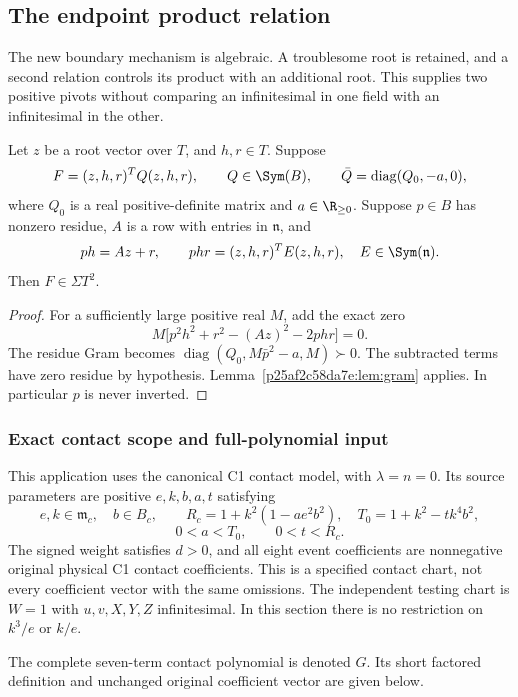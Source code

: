 \subsection{The endpoint product relation}

\label{component:p05180564ed05}
\label{p05180564ed05:sec:productrepair}
The new boundary mechanism is algebraic. A troublesome root is retained, and a second relation controls its product with an additional root. This supplies two positive pivots without comparing an infinitesimal in one field with an infinitesimal in the other.

\begin{lemma}\label{p05180564ed05:lem:productrepair}
Let $z$ be a root vector over $T$, and $h,r\in T$. Suppose
\[
F=(z,h,r)^TQ(z,h,r),\qquad Q\in\Sym(B),\qquad
\bar Q=\operatorname{diag}(Q_0,-a,0),
\]
where $Q_0$ is a real positive-definite matrix and $a\in\R_{\ge0}$. Suppose $p\in B$ has nonzero residue, $A$ is a row with entries in $\mathfrak n$, and
\[
ph=Az+r,\qquad phr=(z,h,r)^TE(z,h,r),\quad E\in\Sym(\mathfrak n).
\]
Then $F\in\Sigma T^2$.
\end{lemma}
\begin{proof}
For a sufficiently large positive real $M$, add the exact zero
\[
M\big[p^2h^2+r^2-(Az)^2-2phr\big]=0.
\]
The residue Gram becomes $\operatorname{diag}(Q_0,M\bar p^2-a,M)\succ0$. The subtracted terms have zero residue by hypothesis. Lemma~\ref{p25af2c58da7e:lem:gram} applies. In particular $p$ is never inverted.
\end{proof}

\subsubsection*{Exact contact scope and full-polynomial input}
This application uses the canonical C1 contact model, with $\lambda=n=0$. Its source parameters are positive $e,k,b,a,t$ satisfying
\[
e,k\in\mathfrak m_c,\quad b\in B_c,\qquad
R_c=1+k^2(1-ae^2b^2),\quad T_0=1+k^2-tk^4b^2,
\]
\[
0<a<T_0,\qquad0<t<R_c.
\]
The signed weight satisfies $d>0$, and all eight event coefficients are nonnegative original physical C1 contact coefficients. This is a specified contact chart, not every coefficient vector with the same omissions. The independent testing chart is $W=1$ with $u,v,X,Y,Z$ infinitesimal. In this section there is no restriction on $k^3/e$ or $k/e$.

The complete seven-term contact polynomial is denoted $G$. Its short factored definition and unchanged original coefficient vector are given below. 

